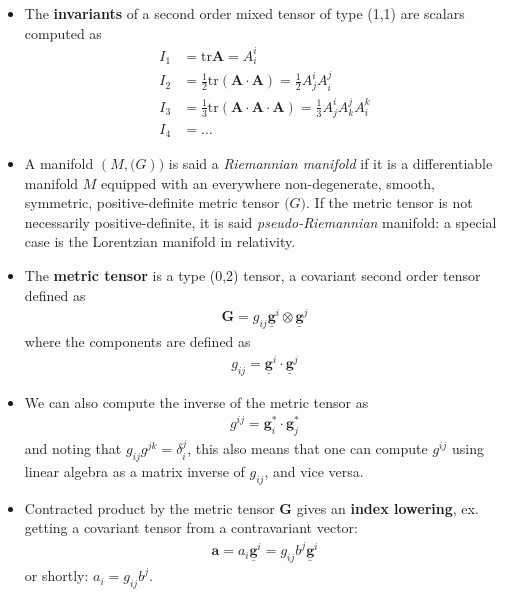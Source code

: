 \documentclass{digitaldynamics}
\def\vcovar#1{{\bm{#1}}^*}
\def\vcontr#1{\underline{\bm{#1}}}
\def\tensor#1{\bm{#1}}
\begin{document}
\begin{itemize}
	\item The \textbf{invariants} of a second order mixed tensor of type (1,1) are scalars computed as
	\begin{align}
	 I_1 &= \mathrm{tr} \tensor{A}  = A^{i}_{i} \\
	 I_2 &= \frac{1}{2} \mathrm{tr} (\tensor{A} \cdot \tensor{A})   = \frac{1}{2}  A^{i}_{j} A^{j}_{i} \\
	 I_3 &= \frac{1}{3} \mathrm{tr} (\tensor{A} \cdot \tensor{A} \cdot \tensor{A})   = \frac{1}{3}  A^{i}_{j} A^{j}_{k}  A^{k}_{i}\\
	 I_4 &= \ldots
	\label{eq:invariants}
	\end{align}




	\item A manifold $( M , \tensor(G) )$ is said a \textit{Riemannian manifold} if it is a differentiable manifold $M$ equipped with an 
	everywhere non-degenerate, smooth, symmetric, positive-definite metric tensor $\tensor(G)$. If the metric tensor is not necessarily 
	positive-definite, it is said \textit{pseudo-Riemannian} manifold: a special case is the Lorentzian manifold in relativity.
	
	
	\item The \textbf{metric tensor} is a type (0,2) tensor, a covariant second order tensor defined as
	\begin{align}
	 \tensor{G} = g_{ij} \vcontr{g}^i \otimes \vcontr{g}^j
	\label{eq:metrictensor}
	\end{align}
	where the components are defined as
	\begin{align}
	 g_{ij} = \vcontr{g}^i \cdot \vcontr{g}^j
	\label{eq:metrictensor}
	\end{align}
	
	\item We can also compute the inverse of the metric tensor as 
	\begin{align}
	 g^{ij} = \vcovar{g}_i \cdot \vcovar{g}_j
	\label{eq:invmetrictensor}
	\end{align}
	and noting that $g_{ij} g^{jk} = \delta_i^j$, this also means that one can compute $g^{ij}$ using linear algebra as a matrix inverse of $g_{ij}$, and vice versa.
	

	\item Contracted product by the metric tensor $\tensor{G}$ gives an \textbf{index lowering}, ex. getting a covariant tensor from a contravariant vector:
	\begin{align}
	  \tensor {a} = a_i \vcontr{g}^i = g_{ij} b^j \vcontr{g}^i
	\label{eq:lowering}
	\end{align}
	or shortly: $a_i = g_{ij} b^j$.
	

\end{itemize}
\end{document}
